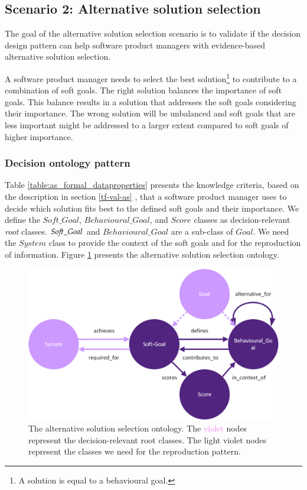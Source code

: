 \subsection{Scenario 2: Alternative solution selection} \label{val-as}
The goal of the alternative solution selection scenario is to validate if the decision design pattern can help software product managers with evidence-based alternative solution selection.

\begin{center}
\large\color{document}{\valtwo} 
\end{center}

A software product manager needs to select the best solution\footnote{A solution is equal to a behavioural goal.} to contribute to a combination of soft goals. The right solution balances the importance of soft goals. This balance results in a solution that addresses the soft goals considering their importance. The wrong solution will be unbalanced and soft goals that are less important might be addressed to a larger extent compared to soft goals of higher importance.

\subsubsection{Decision ontology pattern}
Table \ref{table:as_formal_dataproperties} presents the knowledge criteria, based on the description in section \ref{tf-val-as} , that a software product manager uses to decide which solution fits best to the defined soft goals and their importance. We define the $Soft\_Goal$, $Behavioural\_Goal$, and $Score$ classes as decision-relevant \emph{root} classes. $So{\mkern-2mu f\mkern-3mu}t\_Goal$ and $Behavioural\_Goal$ are a sub-class of $Goal$. We need the $System$ class to provide the context of the soft goals and for the reproduction of information. Figure \ref{fig:as-ont} presents the alternative solution selection ontology.  

\begin{figure}[H]
\centering
  \includegraphics[width=12cm]{../../Images/05_Validation/05_ONT_AS.png}
  \caption{The alternative solution selection ontology. The \textcolor{Violet}{violet} nodes represent the decision-relevant root classes. The  \textcolor{LightViolet}{light violet} nodes represent the classes we need for the reproduction pattern.}
  \label{fig:as-ont}
\end{figure}

